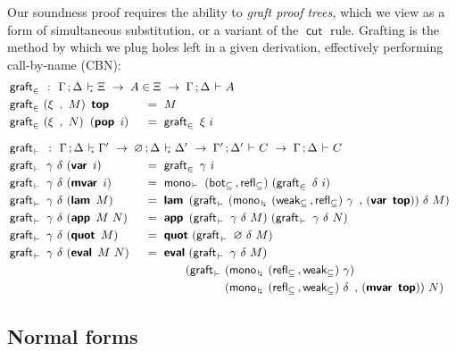 \documentclass[submission,copyright,creativecommons,sharealike,backref=page]{eptcs}
\renewcommand{\leq}{\mathrel{\subseteq}}
\renewcommand{\:}{\mathop{\mkern3mu:\mkern3mu}}
\renewcommand{\.}{\mathop{\mkern3mu.\mkern3mu}}
\renewcommand{\;}{\mathop{;}}
\renewcommand{\,}{\mathop{,}}
\newcommand{\e}{\mathrel{\mkern2mu\vdash\mkern1mu}}
\newcommand{\es}{\mathrel{\mkern2mu\vdash_{\mkern-9mu\scriptscriptstyle{\star}}}}
\renewcommand{\r}{\mathrel{\rightarrow\mkern-1mu}}
\newcommand{\monoe}{\operatorname{\textsf{mono}_{\e}}}
\newcommand{\monoes}{\operatorname{\textsf{mono}_{\es}}}
\newcommand{\botleq}{\operatorname{\textsf{bot}_{\leq}}}
\newcommand{\weakleq}{\operatorname{\textsf{weak}_{\leq}}}
\newcommand{\reflleq}{\operatorname{\textsf{refl}_{\leq}}}
\newcommand{\var}{\operatorname{\textsf{\textbf{var}}}}
\newcommand{\mvar}{\operatorname{\textsf{\textbf{mvar}}}}
\newcommand{\lam}{\operatorname{\textsf{\textbf{lam}}}}
\newcommand{\app}{\operatorname{\textsf{\textbf{app}}}}
\newcommand{\quot}{\operatorname{\textsf{\textbf{quot}}}}
\newcommand{\eval}{\operatorname{\textsf{\textbf{eval}}}}
\renewcommand{\O}{\varnothing}
\newcommand{\tops}{\operatorname{\textsf{\textbf{top}}}}
\newcommand{\pops}{\operatorname{\textsf{\textbf{pop}}}}
\newcommand{\cut}{\operatorname{\textsf{cut}}}
\newcommand{\graftin}{\operatorname{\textsf{graft}_{\in}}}
\newcommand{\grafte}{\operatorname{\textsf{graft}_{\e}}}
\theoremstyle{mystyle}
\begin{document}
Our soundness proof requires the ability to \emph{graft proof trees,} which we view as a form of simultaneous substitution, or a variant of the $\cut$ rule.  Grafting is the method by which we plug holes left in a given derivation, effectively performing call-by-name (CBN):
\begin{alignat*}{3}
  & \graftin ~\:~ \rlap{$\Gamma \; \Delta \es \Xi ~\r~ A \in \Xi ~\r~ \Gamma \; \Delta \e A$}\\
  & \graftin~(\xi ~\,~ M)~\tops              && ~=~ M\\
  & \graftin~(\xi ~\,~ N)~\mkern4mu(\pops~i) && ~=~ \graftin~\xi~i\\[.5\baselineskip]
  & \grafte ~\:~ \rlap{$\Gamma \; \Delta \es \Gamma' ~\r~ \O \; \Delta \es \Delta' ~\r~ \Gamma' \; \Delta' \e C ~\r~ \Gamma \; \Delta \e C$}\\
  & \grafte~\gamma~\delta~(\var~i)    && ~=~ \graftin~\gamma~i\\
  & \grafte~\gamma~\delta~(\mvar~i)   && ~=~ \monoe~\rlap{$(\botleq \, \reflleq)~(\graftin~\delta~i)$}\\
  & \grafte~\gamma~\delta~(\lam~M)    && ~=~ \lam~\rlap{$(\grafte~(\monoes~(\weakleq \, \reflleq)~\gamma ~\,~ (\var~\tops))~\delta~M)$}\\
  & \grafte~\gamma~\delta~(\app~M~N)  && ~=~ \app~\rlap{$(\grafte~\gamma~\delta~M)~(\grafte~\gamma~\delta~N)$}\\
  & \grafte~\gamma~\delta~(\quot~M)   && ~=~ \quot~(\grafte~\O~\delta~M)\\
  & \grafte~\gamma~\delta~(\eval~M~N) && ~=~ \eval~(\grafte~\gamma~\delta~M)\\
  &                                   && \phantom{~=~ \eval~} (\grafte~ (\monoes~(\reflleq \, \weakleq)~\gamma)\\
  &                                   && \phantom{~=~ \eval~(\grafte~}  (\monoes~(\reflleq \, \weakleq)~\delta ~\,~ (\mvar~\tops))~N)
\end{alignat*}


\subsection{Normal forms}
\end{document}
